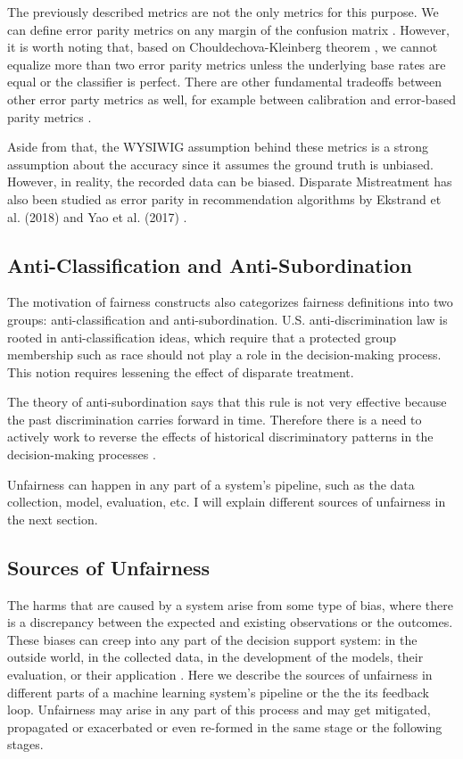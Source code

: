         The previously described metrics are not the only metrics for this purpose. We can define error parity metrics on any margin of the confusion matrix \cite{mitchell2021algorithmic}. However, it is worth noting that, based on Chouldechova-Kleinberg theorem \cite{chouldechova2017fair,Kleinberg:InherentTrade}, we cannot equalize more than two error parity metrics unless the underlying base rates are equal or the classifier is perfect. There are other fundamental tradeoffs between other error party metrics as well, for example between calibration and error-based parity metrics \cite{pleiss2017fairness}. 
        
        Aside from that, the WYSIWIG assumption behind these metrics is a strong assumption about the accuracy since it assumes the ground truth is unbiased. However, in reality, the recorded data can be biased. Disparate Mistreatment has also been studied as error parity in recommendation algorithms by Ekstrand et al. (2018) and Yao et al. (2017) \cite{ekstrand2018all,yao_huang_fatml-2017}.

    \subsection{Anti-Classification and Anti-Subordination}
        
        The motivation of fairness constructs also categorizes fairness definitions into two groups: anti-classification and anti-subordination. U.S. anti-discrimination law is rooted in anti-classification ideas, which require that a protected group membership such as race should not play a role in the decision-making process. This notion requires lessening the effect of disparate treatment.
        
        The theory of anti-subordination says that this rule is not very effective because the past discrimination carries forward in time. Therefore there is a need to actively work to reverse the effects of historical discriminatory patterns in the decision-making processes \cite{barocas2016big}.
    
    Unfairness can happen in any part of a system's pipeline, such as the data collection, model, evaluation, etc. I will explain different sources of unfairness in the next section.

    \subsection{Sources of Unfairness}
        The harms that are caused by a system arise from some type of bias, where there is a discrepancy between the expected and existing observations or the outcomes. These biases can creep into any part of the decision support system: in the outside world, in the collected data, in the development of the models, their evaluation, or their application \cite{sureshframework2019}. Here we describe the sources of unfairness in different parts of a machine learning system's pipeline or the the its feedback loop. Unfairness may arise in any part of this process and may get mitigated, propagated or exacerbated or even re-formed in the same stage or the following stages.
        
